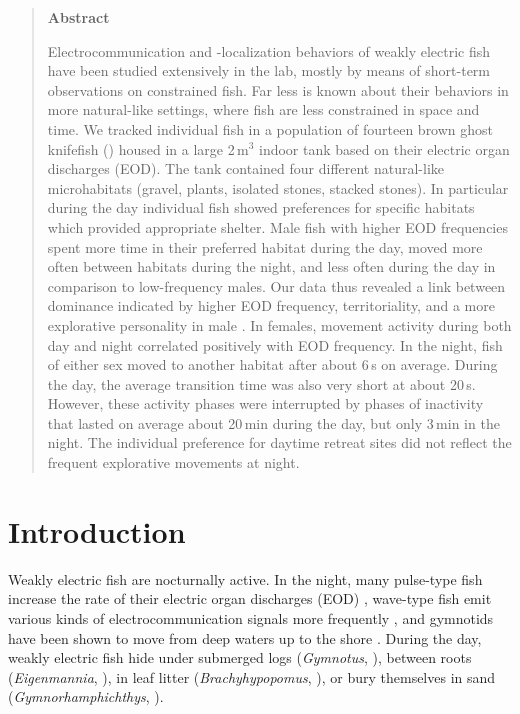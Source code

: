 \begin{quote}
\begin{center}
\large\textbf{Abstract}
\end{center}
Electrocommunication and -localization behaviors of weakly electric fish have been
studied extensively in the lab, mostly by means of short-term observations on constrained
fish. Far less is known about their behaviors in more natural-like settings, where fish
are less constrained in space and time. We tracked individual fish in a population of
fourteen brown ghost knifefish (\Lepto{}) housed in a large 2\,m$^3$ indoor
tank based on their electric organ discharges (EOD). The tank contained four different
natural-like microhabitats (gravel, plants, isolated stones, stacked stones). In particular during the day individual fish showed preferences for specific habitats which provided appropriate shelter. Male fish with higher EOD frequencies spent more time in their preferred habitat during the day, moved more often between habitats during the night, and less often during the day in comparison to low-frequency males. Our data thus
revealed a link between dominance indicated by higher EOD frequency, territoriality, and
a more explorative personality in male \lepto{}. In females, movement activity
during both day and night correlated positively with EOD frequency. In the night, fish
of either sex moved to another habitat after about 6\,s on average. During the day, the
average transition time was also very short at about 20\,s. However, these activity phases
were interrupted by phases of inactivity that lasted on average about 20\,min during the
day, but only 3\,min in the night. The individual preference for daytime retreat sites did not reflect the frequent explorative movements at night.
\end{quote}
\hfill

\section{Introduction}
Weakly electric fish are nocturnally active. In the night, many pulse-type fish increase the
rate of their electric organ discharges (EOD) \citep{Lissmann1965,Stoddard2007}, wave-type fish emit various kinds of electrocommunication signals more frequently \citep{Zupanc2001,Henninger2018}, and gymnotids have been shown to move from deep waters up to the shore \citep{Steinbach1970}. During the day, weakly electric fish hide under submerged logs (\textit{Gymnotus}, \citealp{Westby1988}), between roots (\textit{Eigenmannia}, \citealp{Hopkins1974}), in leaf litter (\textit{Brachyhypopomus}, \citealp{Hagedorn1988}), or bury themselves in sand (\textit{Gymnorhamphichthys}, \citealp{Lissmann1965}).

